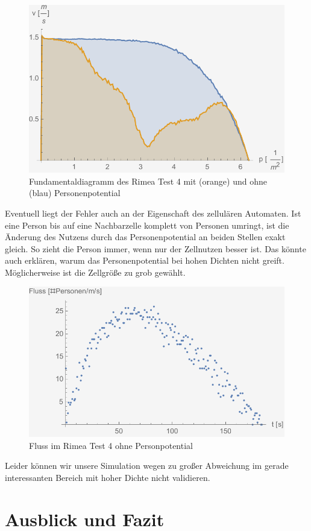 \begin{figure}
	\centering
	\includegraphics[width=0.7\linewidth]{abbildungen/fundamentaldiagramm/vergleich-ohnep}
	\caption{Fundamentaldiagramm des Rimea Test 4 mit (orange) und ohne (blau) Personenpotential}
	\label{fig:rimea4:vergleich-ohnep}
\end{figure}



Eventuell liegt der Fehler auch an der Eigenschaft des zellulären Automaten.
Ist eine Person bis auf eine Nachbarzelle komplett von Personen umringt, ist die Änderung des Nutzens durch das Personenpotential an beiden Stellen exakt gleich. So zieht die Person immer, wenn nur der Zellnutzen besser ist. Das könnte auch erklären, warum das Personenpotential bei hohen Dichten nicht greift. Möglicherweise ist die Zellgröße zu grob gewählt.

\begin{figure}
	\centering
	\includegraphics[width=0.7\linewidth]{abbildungen/fundamentaldiagramm/fluss-ohnep}
	\caption{Fluss im Rimea Test 4 ohne Personpotential}
	\label{fig:rimea4:fluss-ohnep}
\end{figure}

Leider können wir unsere Simulation wegen zu großer Abweichung im gerade interessanten Bereich mit hoher Dichte nicht validieren.

\newpage
\section{Ausblick und Fazit}
